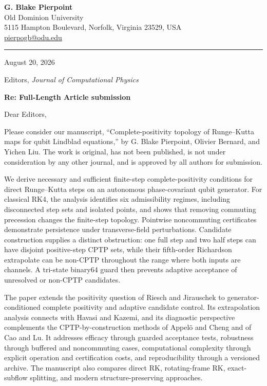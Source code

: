 \documentclass[10pt]{article}
\begin{document}
{\large\bfseries G. Blake Pierpoint}\\[-0.05em]
Old Dominion University\\
5115 Hampton Boulevard, Norfolk, Virginia 23529, USA\\
\href{mailto:pierpogb@odu.edu}{pierpogb@odu.edu}

\vspace{0.25em}
\hrule
\vspace{0.34em}

August 20, 2026

Editors, \textit{Journal of Computational Physics}

\textbf{Re: Full-Length Article submission}

Dear Editors,

Please consider our manuscript, ``Complete-positivity topology of Runge--Kutta maps for qubit Lindblad equations,'' by G. Blake Pierpoint, Olivier Bernard, and Yichen Liu. The work is original, has not been published, is not under consideration by any other journal, and is approved by all authors for submission.

We derive necessary and sufficient finite-step complete-positivity conditions for direct Runge--Kutta steps on an autonomous phase-covariant qubit generator. For classical RK4, the analysis identifies six admissibility regimes, including disconnected step sets and isolated points, and shows that removing commuting precession changes the finite-step topology. Pointwise noncommuting certificates demonstrate persistence under transverse-field perturbations. Candidate construction supplies a distinct obstruction: one full step and two half steps can have disjoint positive-step CPTP sets, while their fifth-order Richardson extrapolate can be non-CPTP throughout the range where both inputs are channels. A tri-state binary64 guard then prevents adaptive acceptance of unresolved or non-CPTP candidates.

The paper extends the positivity question of Riesch and Jirauschek to generator-conditioned complete positivity and adaptive candidate control. Its extrapolation analysis connects with Havasi and Kazemi, and its diagnostic perspective complements the CPTP-by-construction methods of Appel\"o and Cheng and of Cao and Lu. It addresses efficacy through guarded acceptance tests, robustness through buffered and noncommuting cases, computational complexity through explicit operation and certification costs, and reproducibility through a versioned archive. The manuscript also compares direct RK, rotating-frame RK, exact-subflow splitting, and modern structure-preserving approaches.
\end{document}
